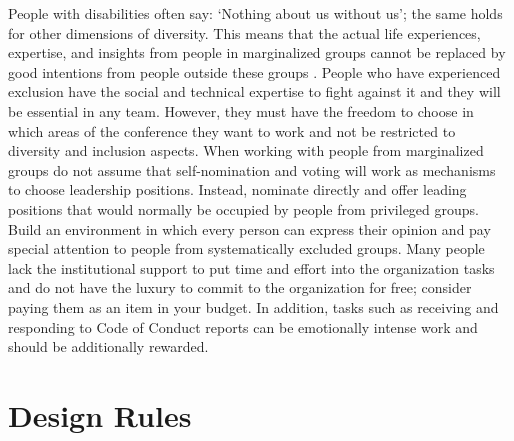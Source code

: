 \documentclass[10pt,letterpaper]{article}
\begin{document}
People with disabilities often say: `Nothing about us without us'; the same holds for other dimensions of diversity. This means that the actual life experiences, expertise, and insights from people in marginalized groups cannot be replaced by good intentions from people outside these groups \cite{costanzachockDesign2020}.
People who have experienced exclusion have the social and technical expertise to fight against it and they will be essential in any team.%
However, they must have the freedom to choose in which areas of the conference they want to work and not be restricted to diversity and inclusion aspects. 
When working with people from marginalized groups do not assume that self-nomination and voting will work as mechanisms to choose leadership positions. Instead, nominate directly and offer leading positions that would normally be occupied by people from privileged groups.
Build an environment in which every person can express their opinion and pay special attention to people from systematically excluded groups.
Many people lack the institutional support to put time and effort into the organization tasks and do not have the luxury to commit to the organization for free; consider paying them as an item in your budget.  
In addition, tasks such as receiving and responding to Code of Conduct reports can be emotionally intense work and should be additionally rewarded.



\section*{Design Rules}
\end{document}

